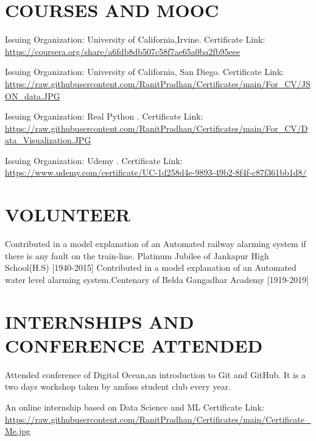\documentclass[11pt,a4paper,sans]{moderncv}        %
\begin{document}
\section{COURSES AND MOOC}
{Issuing Organization: University of California,Irvine.{\newline}
Certificate Link:
\url{ https://coursera.org/share/a6fdb8db507c58f7ae65a0ba2fb95eee}}{}

{Issuing Organization: University of California, San Diego.{\newline}
Certificate Link:
\url{https://raw.githubusercontent.com/RanitPradhan/Certificates/main/For_CV/JSON_data.JPG}}{}

{Issuing Organization: Real Python .{\newline}
Certificate Link: \url{https://raw.githubusercontent.com/RanitPradhan/Certificates/main/For_CV/Data_Visualization.JPG}}{}

{Issuing Organization: Udemy .{\newline}
Certificate Link: 
\url{https://www.udemy.com/certificate/UC-1d258d4e-9893-49b2-8f4f-c87f361bb1d8/}}{}


\section{VOLUNTEER}
{Contributed in a model explanation of an Automated railway alarming system if there is any fault on the train-line. 
Platinum Jubilee of Jankapur High School(H.S) [1940-2015]}
{Contributed in a model explanation of an Automated water level alarming system.Centenary of Belda Gangadhar Academy  [1919-2019]}


\section{INTERNSHIPS AND CONFERENCE ATTENDED}
{Attended conference of Digital Ocean,an introduction to Git and GitHub. It is a two days workshop taken by amfoss student club every year.}

{An online internship based on Data Science and ML
Certificate Link: {\newline}
\url{https://raw.githubusercontent.com/RanitPradhan/Certificates/main/Certificate_Me.jpg }}{}
\end{document}
